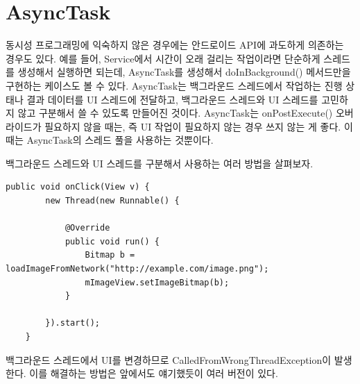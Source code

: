 \section{AsyncTask}
\label{sec:asynctask}
동시성 프로그래밍에 익숙하지 않은 경우에는 안드로이드 API에 과도하게 의존하는 경우도 있다.
예를 들어, Service에서 시간이 오래 걸리는 작업이라면 단순하게 스레드를 생성해서 실행하면 되는데, AsyncTask를 생성해서 doInBackground() 메서드만을 구현하는 케이스도 볼 수 있다. 
AsyncTask는 백그라운드 스레드에서 작업하는 진행 상태나 결과 데이터를 UI 스레드에 전달하고, 백그라운드 스레드와 UI 스레드를 고민하지 않고 구분해서 쓸 수 있도록 만들어진 것이다.
AsyncTask는 onPostExecute() 오버라이드가 필요하지 않을 때는, 즉 UI 작업이 필요하지 않는 경우 쓰지 않는 게 좋다. 이때는 AsyncTask의 스레드 풀을 사용하는 것뿐이다.

백그라운드 스레드와 UI 스레드를 구분해서 사용하는 여러 방법을 살펴보자.
\begin{lstlisting}[frame=single] 
	public void onClick(View v) {
    	new Thread(new Runnable() {
    		
    		@Override
        	public void run() {
            	Bitmap b = loadImageFromNetwork("http://example.com/image.png");
            	mImageView.setImageBitmap(b);
        	}
        	
    	}).start();
	}
\end{lstlisting}
백그라운드 스레드에서 UI를 변경하므로 CalledFromWrongThreadException이 발생한다.
이를 해결하는 방법은 앞에서도 얘기했듯이 여러 버전이 있다.

